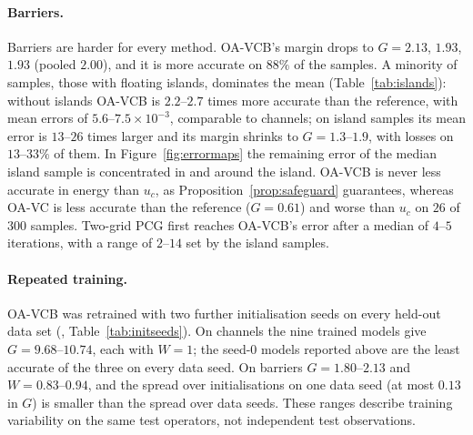 \paragraph{Barriers.} Barriers are harder for every method. OA-VCB's margin drops to $G = 2.13$, $1.93$, $1.93$ (pooled
$2.00$), and it is more accurate on $88\%$ of the samples. A minority of samples, those with floating islands, dominates
the mean (Table~\ref{tab:islands}): without islands OA-VCB is $2.2$--$2.7$ times more accurate than the reference, with mean
errors of $5.6$--$7.5\times10^{-3}$, comparable to channels; on island samples its mean error is $13$--$26$ times larger and its
margin shrinks to $G = 1.3$--$1.9$, with losses on $13$--$33\%$ of them. In Figure~\ref{fig:errormaps} the remaining error of
the median island sample is concentrated in and around the island. OA-VCB is never less accurate in energy than $u_c$, as
Proposition~\ref{prop:safeguard} guarantees, whereas OA-VC is less accurate than the reference ($G = 0.61$) and worse than
$u_c$ on $26$ of $300$ samples. Two-grid PCG first reaches OA-VCB's error after a median of $4$--$5$ iterations, with a range of
$2$--$14$ set by the island samples.

\paragraph{Repeated training.}\label{sec:initseeds} OA-VCB was retrained with two further initialisation seeds on every
held-out data set (, Table~\ref{tab:initseeds}). On channels the nine trained models give
$G = 9.68$--$10.74$, each with $W = 1$; the seed-0 models reported above are the least accurate of the three on every data
seed. On barriers $G = 1.80$--$2.13$ and $W = 0.83$--$0.94$, and the spread over initialisations on one data seed (at most
$0.13$ in $G$) is smaller than the spread over data seeds. These ranges describe training variability on the same test
operators, not independent test observations.

